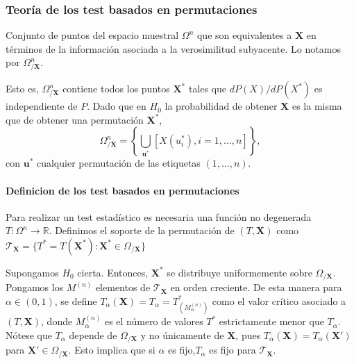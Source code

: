 \subsubsection{Teoría de los test basados en permutaciones}

\begin{definicion}
	Conjunto de puntos del espacio muestral $\Omega^n$ que 
son equivalentes a $\mathbf{X}$ en términos de la información 
asociada a la verosimilitud subyacente. Lo notamos por 
$\Omega^n_{/\mathbf{X}}$.
\end{definicion}

	Esto es, $\Omega^n_{/\mathbf{X}}$ contiene todos los 
puntos $\mathbf{X}^*$ tales que $dP(X)/dP(X^*)$ es 
independiente de $P$. Dado que en $H_0$ la probabilidad de 
obtener $\mathbf{X}$ es la misma que de obtener una 
permutación $\mathbf{X}^*$,
	\[ 
		\Omega^n_{/\mathbf{X}} = 
			\left\lbrace
				\underset{\mathbf{u}^*}{\bigcup}
					[ X(u_i^*), i = 1, \dots, n ]
			\right\rbrace ,
	\]
	con $\mathbf{u}^*$ cualquier permutación de las etiquetas 
$(1, \dots, n)$.

\paragraph{Definicion de los test basados en permutaciones}
\begin{definicion}
	Para realizar un test estadístico es necesaria una 
función no degenerada $T: \Omega^n \rightarrow \mathbb{R}$. 
Definimos el soporte de la permutación de $(T, \mathbf{X})$ 
como $\mathcal{T}_\mathbf{X} = \{ T^* = T(\mathbf{X}^*): 
\mathbf{X}^* \in \Omega_{/\mathbf{X}}\}$ 
\end{definicion}	

	Supongamos $H_0$ cierta. Entonces, $\mathbf{X}^*$ se 
distribuye uniformemente sobre $\Omega_{/\mathbf{X}}$. 
Pongamos los $M^{(n)}$ elementos de $\mathcal{T}_\mathbf{X}$ 
en orden creciente. De esta manera para $\alpha \in (0,1)$, 
se define $T_\alpha(\mathbf{X}) = T_\alpha = T^*_{(M^{(n)}_
\alpha)}$ como el valor crítico asociado a $(T, \mathbf{X})$, 
donde $M^{(n)}_\alpha$ es el número de valores $T^*$ 
estrictamente menor que $T_\alpha$. Nótese que $T_\alpha$ 
depende de $\Omega_{/\mathbf{X}}$ y no únicamente de $
\mathbf{X}$, pues $T_\alpha(\mathbf{X}) = T_
\alpha(\mathbf{X}')$ para $\mathbf{X}' \in \Omega_{/
\mathbf{X}}$. Esto implica que si $\alpha$ es fijo,$T_\alpha$ 
es fijo para $\mathcal{T}_\mathbf{X}$.
	
